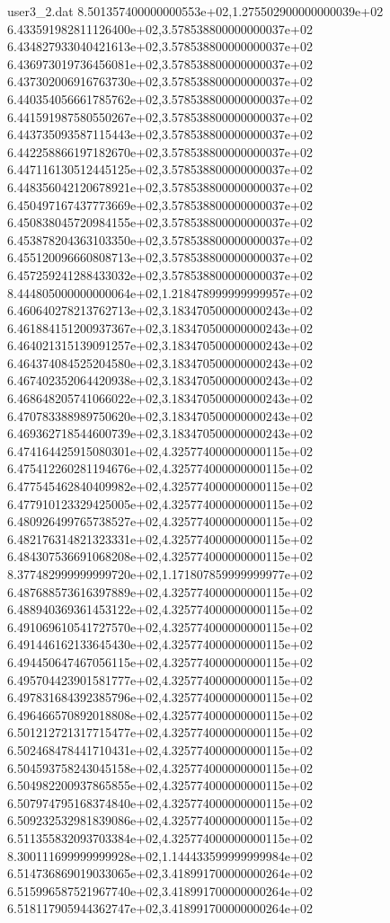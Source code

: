 \begin{filecontents}{user3_2.dat}
8.501357400000000553e+02,1.275502900000000039e+02
6.433591982811126400e+02,3.578538800000000037e+02
6.434827933040421613e+02,3.578538800000000037e+02
6.436973019736456081e+02,3.578538800000000037e+02
6.437302006916763730e+02,3.578538800000000037e+02
6.440354056661785762e+02,3.578538800000000037e+02
6.441591987580550267e+02,3.578538800000000037e+02
6.443735093587115443e+02,3.578538800000000037e+02
6.442258866197182670e+02,3.578538800000000037e+02
6.447116130512445125e+02,3.578538800000000037e+02
6.448356042120678921e+02,3.578538800000000037e+02
6.450497167437773669e+02,3.578538800000000037e+02
6.450838045720984155e+02,3.578538800000000037e+02
6.453878204363103350e+02,3.578538800000000037e+02
6.455120096660808713e+02,3.578538800000000037e+02
6.457259241288433032e+02,3.578538800000000037e+02
8.444805000000000064e+02,1.218478999999999957e+02
6.460640278213762713e+02,3.183470500000000243e+02
6.461884151200937367e+02,3.183470500000000243e+02
6.464021315139091257e+02,3.183470500000000243e+02
6.464374084525204580e+02,3.183470500000000243e+02
6.467402352064420938e+02,3.183470500000000243e+02
6.468648205741066022e+02,3.183470500000000243e+02
6.470783388989750620e+02,3.183470500000000243e+02
6.469362718544600739e+02,3.183470500000000243e+02
6.474164425915080301e+02,4.325774000000000115e+02
6.475412260281194676e+02,4.325774000000000115e+02
6.477545462840409982e+02,4.325774000000000115e+02
6.477910123329425005e+02,4.325774000000000115e+02
6.480926499765738527e+02,4.325774000000000115e+02
6.482176314821323331e+02,4.325774000000000115e+02
6.484307536691068208e+02,4.325774000000000115e+02
8.377482999999999720e+02,1.171807859999999977e+02
6.487688573616397889e+02,4.325774000000000115e+02
6.488940369361453122e+02,4.325774000000000115e+02
6.491069610541727570e+02,4.325774000000000115e+02
6.491446162133645430e+02,4.325774000000000115e+02
6.494450647467056115e+02,4.325774000000000115e+02
6.495704423901581777e+02,4.325774000000000115e+02
6.497831684392385796e+02,4.325774000000000115e+02
6.496466570892018808e+02,4.325774000000000115e+02
6.501212721317715477e+02,4.325774000000000115e+02
6.502468478441710431e+02,4.325774000000000115e+02
6.504593758243045158e+02,4.325774000000000115e+02
6.504982200937865855e+02,4.325774000000000115e+02
6.507974795168374840e+02,4.325774000000000115e+02
6.509232532981839086e+02,4.325774000000000115e+02
6.511355832093703384e+02,4.325774000000000115e+02
8.300111699999999928e+02,1.144433599999999984e+02
6.514736869019033065e+02,3.418991700000000264e+02
6.515996587521967740e+02,3.418991700000000264e+02
6.518117905944362747e+02,3.418991700000000264e+02

\end{filecontents}
